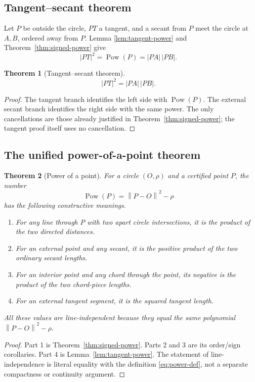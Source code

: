 \documentclass[11pt,letterpaper]{article}
\newtheorem{theorem}{Theorem}[section]
\theoremstyle{definition}
\theoremstyle{remark}
\newcommand{\Pow}{\operatorname{Pow}}
\newcommand{\norm}[1]{\left\lVert #1\right\rVert}
\begin{document}
\subsection{Tangent--secant theorem}

Let \(P\) be outside the circle, \(PT\) a tangent, and a secant from \(P\)
meet the circle at \(A,B\), ordered away from \(P\).  Lemma
\ref{lem:tangent-power} and Theorem~\ref{thm:signed-power} give
\[
 |PT|^2=\Pow(P)=|PA|\,|PB|.
\]

\begin{theorem}[Tangent--secant theorem]
\label{thm:tangent-secant}
\[
 |PT|^2=|PA|\,|PB|.
 \tag{8.3}\label{eq:tangent-secant}
\]
\end{theorem}

\begin{proof}
The tangent branch identifies the left side with \(\Pow(P)\).  The external
secant branch identifies the right side with the same power.  The only
cancellations are those already justified in Theorem~\ref{thm:signed-power};
the tangent proof itself uses no cancellation.
\end{proof}

\subsection{The unified power-of-a-point theorem}

\begin{theorem}[Power of a point]
\label{thm:power-final}
For a circle \((O,\rho)\) and a certified point \(P\), the number
\[
 \Pow(P)=\norm{P-O}^2-\rho
\]
has the following constructive meanings.
\begin{enumerate}
\item For any line through \(P\) with two apart circle intersections, it is
  the product of the two directed distances.
\item For an external point and any secant, it is the positive product of the
  two ordinary secant lengths.
\item For an interior point and any chord through the point, its negative is
  the product of the two chord-piece lengths.
\item For an external tangent segment, it is the squared tangent length.
\end{enumerate}
All these values are line-independent because they equal the same polynomial
\(\norm{P-O}^2-\rho\).
\end{theorem}

\begin{proof}
Part 1 is Theorem~\ref{thm:signed-power}.  Parts 2 and 3 are its order/sign
corollaries.  Part 4 is Lemma~\ref{lem:tangent-power}.  The statement of
line-independence is literal equality with the definition \eqref{eq:power-def},
not a separate compactness or continuity argument.
\end{proof}
\end{document}
